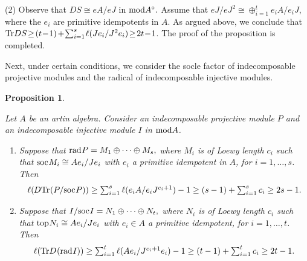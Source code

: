 \documentclass[10pt]{amsart}
\newtheorem{Prop}[Theo]{Proposition}
\theoremstyle{definition}
\newcommand{\mmod}{{\rm mod}}
\newcommand{\rad}{{\rm rad}\hspace{.5pt}}
\newcommand{\soc}{{\rm soc}\hspace{.5pt}}
\newcommand{\ntop}{{\rm top}\hspace{.5pt}}
\newcommand{\vp}{\vspace{.5pt}}
\begin{document}
\vspace{1,5pt}

(2) Observe that $DS\cong eA/eJ$ in $\mmod A^\circ.$ Assume that $eJ/eJ^2 \cong \oplus_{i=1}^t e_iA/e_iJ$, where the $e_i$ are primitive idempotents in $A$. As argued above, \vp we conclude that ${\rm Tr}DS \!\ge\! (t\!-\!1) \hspace{-1pt} +\! \sum_{i=1}^s\hspace{-1pt}\ell(Je_i/J^2e_i) \!\ge\! 2t\!-\!1$. The proof of the proposition is completed.

\smallskip

Next, under certain conditions, we consider the socle factor of indecomposable projective modules and the radical of indecomposable injective modules.

\begin{Prop}\label{SF_ART_length} 

Let $A$ be an artin algebra. Consider an indecomposable projective module $P$ and an indecomposable injective module $I$ in $\mmod A$. 

\begin{enumerate}[$(1)$]

\vspace{-2pt}

\item Suppose that $\rad P=M_1\oplus \cdots \oplus M_s,$ where $M_i$ is of Loewy length $c_i$ such that $\soc M_i\cong Ae_i/Je_i$ with $e_i$ a primitive idempotent in $A$, for $i=1, \ldots, s$. \vspace{-3.5pt} Then 
$$\ell(\hspace{-.5pt} D{\rm Tr}\hspace{.5pt} (P/\soc P)) \ge \textstyle\sum_{i=1}^s  \ell(e_iA/e_iJ^{c_i+1}) - 1 \ge  (s-1) + \sum_{i=1}^s c_i\ge 2s-1.$$

\vspace{-2.5pt}

\item Suppose that $I/\soc I=N_1\oplus \cdots \oplus N_t,$ where $N_i$ is of Loewy length $c_i$ such that $\ntop N_i\cong Ae_i/Je_i$ with $e_i\in A$ a primitive idempotent, for $i=1, \ldots, t$. Then  \vspace{-4pt}
$$\ell({\rm Tr} D \hspace{.5pt} (\rad I)) \ge \textstyle \sum_{i=1}^t \ell(Ae_i/J^{c_i+1} e_i) - 1 \ge  (t-1) + \sum_{i=1}^tc_i\ge 2t-1.$$

\end{enumerate}\end{Prop}
\end{document}
